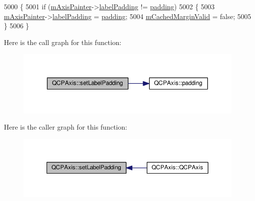 \begin{DoxyCode}
5000 \{
5001   \textcolor{keywordflow}{if} (\hyperlink{class_q_c_p_axis_aeeae00935bd2dab82d64f32544a90913}{mAxisPainter}->\hyperlink{class_q_c_p_axis_painter_private_a3f7465372df132bf7814345ea697dd34}{labelPadding} != \hyperlink{class_q_c_p_axis_abb85015a9467ec176e70698307ec833a}{padding})
5002   \{
5003     \hyperlink{class_q_c_p_axis_aeeae00935bd2dab82d64f32544a90913}{mAxisPainter}->\hyperlink{class_q_c_p_axis_painter_private_a3f7465372df132bf7814345ea697dd34}{labelPadding} = \hyperlink{class_q_c_p_axis_abb85015a9467ec176e70698307ec833a}{padding};
5004     \hyperlink{class_q_c_p_axis_a2cde37b6e385f47e11322df4ac1b0e9b}{mCachedMarginValid} = \textcolor{keyword}{false};
5005   \}
5006 \}
\end{DoxyCode}


Here is the call graph for this function\+:\nopagebreak
\begin{figure}[H]
\begin{center}
\leavevmode
\includegraphics[width=350pt]{class_q_c_p_axis_a4391192a766e5d20cfe5cbc17607a7a2_cgraph}
\end{center}
\end{figure}




Here is the caller graph for this function\+:\nopagebreak
\begin{figure}[H]
\begin{center}
\leavevmode
\includegraphics[width=350pt]{class_q_c_p_axis_a4391192a766e5d20cfe5cbc17607a7a2_icgraph}
\end{center}
\end{figure}


\hypertarget{class_q_c_p_axis_a08af1c72db9ae4dc8cb8a973d44405ab}{}
